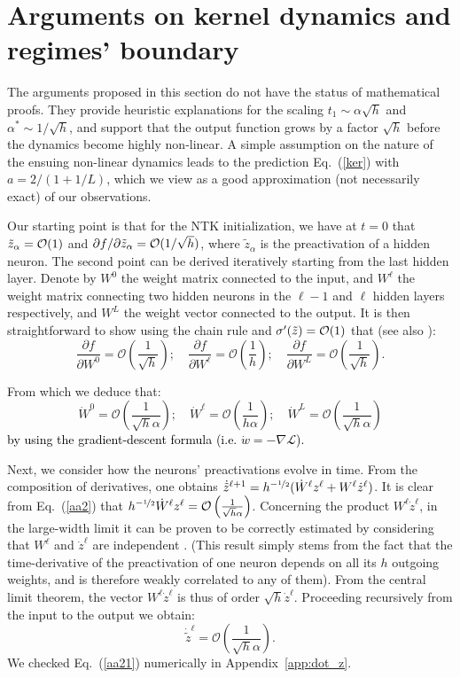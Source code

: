 \documentclass{article}
\newcommand{\be}{\begin{equation}}
\newcommand{\ee}{\end{equation}}
\newcommand{\mm}[1]{\textcolor{black}{#1}}
\renewcommand{\cite}[1]{\citep{#1}}
\newcommand{\eref}[1]{Eq.~(\ref{#1})}
\newcommand{\aref}[1]{Appendix~\ref{#1}}
\begin{document}
\section{Arguments on kernel dynamics and regimes' boundary}\label{app:informalargument}

The arguments proposed in this section do not have the status of mathematical proofs. 
They provide heuristic explanations for the scaling  $t_1\sim \alpha \sqrt{h}$ and  $\alpha^*\sim 1/\sqrt{h}$,  and support that the output function grows by a factor $\sqrt{h}$ before the dynamics become highly non-linear. A simple assumption on the nature of the ensuing non-linear dynamics leads to the prediction \eref{ker} with $a=2/(1+1/L)$, which we view as a good approximation (not necessarily exact) of our observations. 

Our starting point is that for the NTK initialization, we have at $t=0$ that $\tilde z_\alpha={\cal O}(1)$ and $\partial f/\partial \tilde z_\alpha= {\cal O}(1/\sqrt{h})$,
where $\tilde z_\alpha$ is the preactivation of a hidden neuron.  The second point can be derived iteratively starting from the last hidden layer. 
Denote by $W^0$ the weight matrix connected to the input, and $W^\ell$ the weight matrix connecting two hidden neurons in the $\ell-1$ and $\ell$ hidden layers respectively, and $W^L$ the weight vector connected to the output. It is then straightforward to show using the chain rule and $\sigma'(\tilde z)={\cal O}(1)$ that (see also \cite{arora2019exact}):
\be
\label{aa1}
\frac{\partial f}{\partial W^0}={\mathcal{O}}\left(\frac{1}{\sqrt{h}}\right);\quad
\frac{\partial f}{\partial W^\ell}={\mathcal{O}}\left(\frac{1}{h}\right);\quad
\frac{\partial f}{\partial W^L}={\mathcal{O}}\left(\frac{1}{\sqrt{h}}\right).
\ee

From which we deduce that:
\be
\label{aa2}
\dot W^0={\mathcal{O}}\left(\frac{1}{\sqrt{h} \alpha}\right);\quad
\dot W^\ell={\mathcal{O}}\left(\frac{1}{h \alpha}\right);\quad
\dot W^L={\mathcal{O}}\left(\frac{1}{\sqrt{h}\alpha}\right)
\ee
\mm{by using the gradient-descent formula (i.e. $\dot w = -\nabla \mathcal{L}$).} 

Next, we consider how the neurons' preactivations evolve in time. From the composition of derivatives, one obtains $\dot{ \tilde z}^{\ell+1} = h^{-\nicefrac12} (\dot W^\ell z^\ell + W^\ell \dot z^\ell)$.
It is clear from \eref{aa2} that $h^{-\nicefrac12} \dot W^\ell z^\ell={\mathcal{O}}\left(\frac{1}{\sqrt{h}\alpha}\right)$.  Concerning the product $W^\ell \dot z^\ell$, in the large-width limit it can be proven to be correctly estimated by considering that $W^\ell$ and $\dot z^\ell$ are independent \cite{Dyer19}. (This result simply stems from the fact that the time-derivative of the preactivation of one neuron depends on all its $h$ outgoing  weights, and is therefore weakly correlated to any of them). From the central limit theorem, the vector $W^\ell \dot z^\ell$ is thus of order $\sqrt{h}  \dot z^\ell$. Proceeding recursively from the input to the output we obtain:
\be \label{aa21}
\dot {\tilde z}^\ell={\mathcal{O}}\left(\frac{1}{\sqrt{h} \alpha}\right).
\ee
We checked \eref{aa21} numerically in \aref{app:dot_z}.
\end{document}
